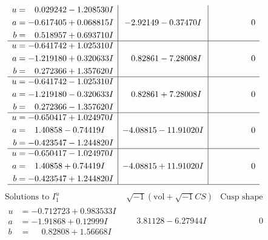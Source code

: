 \documentclass[1p]{elsarticle_modified}
\theoremstyle{definition}
\newcommand{\I}{\sqrt{-1}}
\begin{document}
$$\begin{array}{c|c|c}
\begin{aligned}
u &= \phantom{-}0.029242 - 1.208530 I \\
a &= -0.617405 + 0.068815 I \\
b &= \phantom{-}0.518957 + 0.693710 I\end{aligned}
 & -2.92149 - 0.37470 I & \phantom{-0.000000 } 0 \\ \hline\begin{aligned}
u &= -0.641742 + 1.025310 I \\
a &= -1.219180 + 0.320633 I \\
b &= \phantom{-}0.272366 + 1.357620 I\end{aligned}
 & \phantom{-}0.82861 - 7.28008 I & \phantom{-0.000000 } 0 \\ \hline\begin{aligned}
u &= -0.641742 - 1.025310 I \\
a &= -1.219180 - 0.320633 I \\
b &= \phantom{-}0.272366 - 1.357620 I\end{aligned}
 & \phantom{-}0.82861 + 7.28008 I & \phantom{-0.000000 } 0 \\ \hline\begin{aligned}
u &= -0.650417 + 1.024970 I \\
a &= \phantom{-}1.40858 - 0.74419 I \\
b &= -0.423547 - 1.244820 I\end{aligned}
 & -4.08815 - 11.91020 I & \phantom{-0.000000 } 0 \\ \hline\begin{aligned}
u &= -0.650417 - 1.024970 I \\
a &= \phantom{-}1.40858 + 0.74419 I \\
b &= -0.423547 + 1.244820 I\end{aligned}
 & -4.08815 + 11.91020 I & \phantom{-0.000000 } 0\\
 \hline 
 \end{array}$$\newpage$$\begin{array}{c|c|c}  
\text{Solutions to }I^u_{1}& \I (\text{vol} + \sqrt{-1}CS) & \text{Cusp shape}\\
 \hline 
\begin{aligned}
u &= -0.712723 + 0.983533 I \\
a &= -1.91868 + 0.12999 I \\
b &= \phantom{-}0.82808 + 1.56668 I\end{aligned}
 & \phantom{-}3.81128 - 6.27944 I & \phantom{-0.000000 } 0 \\ \hline\begin{aligned}

\end{aligned}
\end{array}$$
\end{document}
